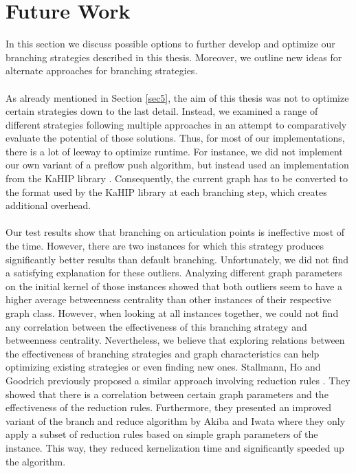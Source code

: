\documentclass[]{article}
\begin{document}
\section{Future Work} \label{sec6}
In this section we discuss possible options to further develop and optimize our branching strategies described in this thesis. Moreover, we outline new ideas for alternate approaches for branching strategies.

\paragraph{}
As already mentioned in Section \ref{sec5}, the aim of this thesis was not to optimize certain strategies down to the last detail. Instead, we examined a range of different strategies following multiple approaches in an attempt to comparatively evaluate the potential of those solutions. Thus, for most of our implementations, there is a lot of leeway to optimize runtime. For instance, we did not implement our own variant of a preflow push algorithm, but instead used an implementation from the KaHIP library \cite{bibid}. Consequently, the current graph has to be converted to the format used by the KaHIP library at each branching step, which creates additional overhead.

\paragraph{}
Our test results show that branching on articulation points is ineffective most of the time. However, there are two instances for which this strategy produces significantly better results than default branching. Unfortunately, we did not find a satisfying explanation for these outliers. Analyzing different graph parameters on the initial kernel of those instances showed that both outliers seem to have a higher average betweenness centrality than other instances of their respective graph class. However, when looking at all instances together, we could not find any correlation between the effectiveness of this branching strategy and betweenness centrality. Nevertheless, we believe that exploring relations between the effectiveness of branching strategies and graph characteristics can help optimizing existing strategies or even finding new ones. Stallmann, Ho and Goodrich previously proposed a similar approach involving reduction rules \cite{bibid}. They showed that there is a correlation between certain graph parameters and the effectiveness of the reduction rules. Furthermore, they presented an improved variant of the branch and reduce algorithm by Akiba and Iwata \cite{AkibaIwata} where they only apply a subset of reduction rules based on simple graph parameters of the instance. This way, they reduced kernelization time and significantly speeded up the algorithm.
\end{document}
